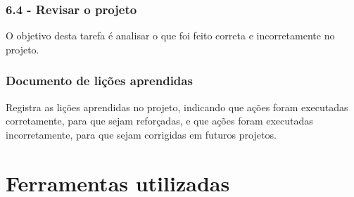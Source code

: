 \subsubsection*{\textbf{6.4 - Revisar o projeto}}

O objetivo desta tarefa é analisar o que foi feito correta e incorretamente no projeto.

\subsubsection*{Documento de lições aprendidas}

Registra as lições aprendidas no projeto, indicando que ações foram executadas corretamente, para que sejam reforçadas, e que ações foram executadas incorretamente, para que sejam corrigidas em futuros projetos.

\section{Ferramentas utilizadas}

\cite{scikit-learn}
\cite{pandas}